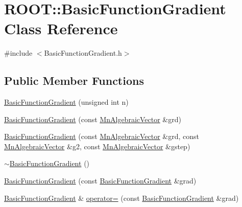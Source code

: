 \hypertarget{classROOT_1_1Minuit2_1_1BasicFunctionGradient}{}\section{R\+O\+OT\+:\+:Basic\+Function\+Gradient Class Reference}
\label{classROOT_1_1Minuit2_1_1BasicFunctionGradient}


{\ttfamily \#include $<$Basic\+Function\+Gradient.\+h$>$}

\subsection*{Public Member Functions}
\begin{DoxyCompactItemize}
\item 
\mbox{\hyperlink{classROOT_1_1Minuit2_1_1BasicFunctionGradient_ae23497e9b9a0f07542b5f6a017db6259}{Basic\+Function\+Gradient}} (unsigned int n)
\item 
\mbox{\hyperlink{classROOT_1_1Minuit2_1_1BasicFunctionGradient_aace69521fac422830a6a6e19b1f6fd77}{Basic\+Function\+Gradient}} (const \mbox{\hyperlink{namespaceROOT_1_1Minuit2_a62ed97730a1ca8d3fbaec64a19aa11c9}{Mn\+Algebraic\+Vector}} \&grd)
\item 
\mbox{\hyperlink{classROOT_1_1Minuit2_1_1BasicFunctionGradient_a21eb32598f6a67f9cb45c1f4dac05825}{Basic\+Function\+Gradient}} (const \mbox{\hyperlink{namespaceROOT_1_1Minuit2_a62ed97730a1ca8d3fbaec64a19aa11c9}{Mn\+Algebraic\+Vector}} \&grd, const \mbox{\hyperlink{namespaceROOT_1_1Minuit2_a62ed97730a1ca8d3fbaec64a19aa11c9}{Mn\+Algebraic\+Vector}} \&g2, const \mbox{\hyperlink{namespaceROOT_1_1Minuit2_a62ed97730a1ca8d3fbaec64a19aa11c9}{Mn\+Algebraic\+Vector}} \&gstep)
\item 
\mbox{\hyperlink{classROOT_1_1Minuit2_1_1BasicFunctionGradient_a55ce8afeb4e559cf2d2c88aca167b524}{$\sim$\+Basic\+Function\+Gradient}} ()
\item 
\mbox{\hyperlink{classROOT_1_1Minuit2_1_1BasicFunctionGradient_a1193087c872c26bca560f069f2efc353}{Basic\+Function\+Gradient}} (const \mbox{\hyperlink{classROOT_1_1Minuit2_1_1BasicFunctionGradient}{Basic\+Function\+Gradient}} \&grad)
\item 
\mbox{\hyperlink{classROOT_1_1Minuit2_1_1BasicFunctionGradient}{Basic\+Function\+Gradient}} \& \mbox{\hyperlink{classROOT_1_1Minuit2_1_1BasicFunctionGradient_a1bf2f76bab802466b8697136fbea33e4}{operator=}} (const \mbox{\hyperlink{classROOT_1_1Minuit2_1_1BasicFunctionGradient}{Basic\+Function\+Gradient}} \&grad)

\end{DoxyCompactItemize}
